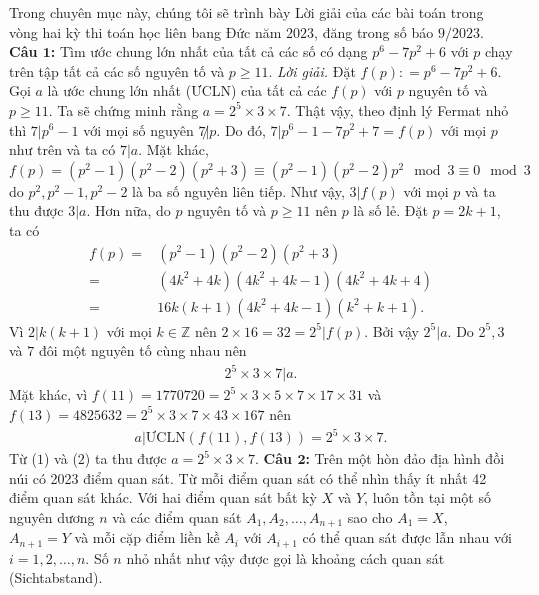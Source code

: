 \begin{multicols}{2}
	Trong chuyên mục này, chúng tôi sẽ trình bày Lời giải của các bài toán trong vòng hai kỳ thi toán học liên bang Đức năm $2023$, đăng trong số báo $9/2023$. 
	\vskip 0.1cm
	\textbf{Câu $\pmb{1}$:} Tìm ước chung lớn nhất của tất cả các số có dạng $p^6 - 7p^2 +6$ với $p$ chạy trên tập tất cả các số nguyên tố và $p \ge 11$.
	\vskip 0.1cm
	\textit{Lời giải.}
	Đặt $f(p) \colon =p^6 - 7p^2 +6$. Gọi $a$ là ước chung lớn nhất (ƯCLN) của tất cả các $f(p)$ với $p$ nguyên tố và $p \ge 11$. Ta sẽ chứng minh rằng $a = 2^5\times 3 \times 7$.
	\vskip 0.1cm	
	Thật vậy, theo định lý Fermat nhỏ thì $7|p^6 - 1$ với mọi số nguyên $7 \not | p$. Do đó, $7 |p^6 - 1  - 7p^2 + 7 = f(p)$ với mọi $p$ như trên và ta có $7 | a$.
	\vskip 0.1cm	
	Mặt khác, 
	$f(p) = (p^2-1)(p^2-2)(p^2+3) \equiv (p^2-1)(p^2-2)p^2 \mod 3 \equiv 0 \mod 3$ do $p^2, p^2-1, p^2-2$ là ba số nguyên liên tiếp. Như vậy, $3 | f(p)$ với mọi $p$ và ta thu được $3|a$.
	\vskip 0.1cm	
	Hơn nữa, do $p$ nguyên tố và $p \ge 11$ nên $p$ là số lẻ. Đặt $p= 2k+1$, ta có
	\begin{align*}
			f(p) = & (p^2-1)(p^2-2)(p^2+3) \\
			= & (4k^2 + 4k) (4k^2 + 4k-1)(4k^2+4k+4) \\
			= & 16k(k+1)(4k^2 + 4k-1)(k^2 + k + 1).
	\end{align*}
	Vì $2 |k(k+1)$ với mọi $k \in \mathbb{Z}$ nên $2\times 16 = 32 = 2^5 |f(p)$. Bởi vậy $2^5 |a$.
	\vskip 0.1cm
	Do $2^5, 3$ và $7$ đôi một nguyên tố cùng nhau nên
	\begin{align*}
		2^5 \times 3 \times 7 |a. \tag{$1$}
	\end{align*}
		Mặt khác, vì
		$
		f(11) = 1770720 = 2^5 \times 3 \times 5 \times 7 \times 17 \times 31
		$
		và
		$
		f(13) = 4825632 = 2^5 \times 3 \times 7 \times 43 \times 167
		$
		nên 
		\begin{align*}
			a |\text{ƯCLN}(f(11), f(13)) = 2^5\times 3 \times 7. \tag{$2$}
		\end{align*}
		Từ ($1$) và ($2$) ta thu được $a = 2^5\times 3 \times 7$.
	\vskip 0.1cm
	\textbf{Câu $\pmb{2}$:} Trên một hòn đảo địa hình đồi núi có 2023 điểm quan sát. Từ mỗi điểm quan sát có thể nhìn thấy ít nhất 42 điểm quan sát khác. Với hai điểm quan sát bất kỳ $X$ và $Y$, luôn tồn tại một số nguyên dương $n$ và các điểm quan sát $A_1,  A_2, \ldots, A_{n+1}$ sao cho $A_1 = X$, $A_{n+1} = Y$ và mỗi cặp điểm liền kề $A_i$ với $A_{i+1}$ có thể quan sát được lẫn nhau với $i = 1, 2, \ldots, n$. Số $n$ nhỏ nhất như vậy được gọi là khoảng cách quan sát (Sichtabstand). 

\end{multicols}
